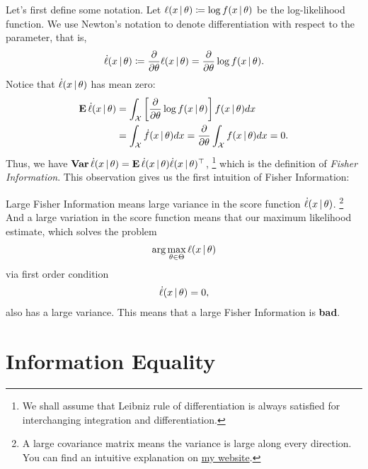 \documentclass[a4paper]{article}
\begin{document}
Let's first define some notation.
Let $\ell(x\,|\,\theta)\coloneqq\log f(x\,|\,\theta)$ be the log-likelihood function.
We use Newton's notation to denote differentiation with respect to the parameter,
that is,
\begin{align*}
	\dot\ell(x\,|\,\theta)
	\coloneqq \frac{\partial}{\partial\theta} \ell(x\,|\,\theta)
	= \frac{\partial}{\partial\theta} \log f(x\,|\,\theta).
\end{align*}
Notice that $\dot\ell(x\,|\,\theta)$ has mean zero:
\begin{align*}
	\operatorname{\text{\textrm{\upshape\textbf{E}}}}\dot\ell(x\,|\,\theta)
	&= \int_{\mathcal{X}} \left[ \frac{\partial}{\partial\theta} \log f(x\,|\,\theta) \right] f(x\,|\,\theta) dx \\
	&= \int_{\mathcal{X}} \dot f(x\,|\,\theta) dx 
	= \frac{\partial}{\partial\theta} \int_{\mathcal{X}} f(x\,|\,\theta) dx = 0.
\end{align*}
Thus, we have $\operatorname{\text{\textrm{\upshape\textbf{Var}}}}\dot\ell(x\,|\,\theta) = \operatorname{\text{\textrm{\upshape\textbf{E}}}}\dot\ell(x\,|\,\theta)\dot\ell(x\,|\,\theta)^{\top}$,
\footnote{
	We shall assume that Leibniz rule of differentiation is always satisfied for interchanging integration and differentiation.
}
which is the definition of \emph{Fisher Information}.
This observation gives us the first intuition of Fisher Information:

\begin{intuition}\label{intuition-1}
	Large Fisher Information means large variance in the score function $\dot\ell(x\,|\,\theta)$.
	\footnote{
		A large covariance matrix means the variance is large along every direction.
		You can find an intuitive explanation on \href{https://jessekelighine.com}{my website}.
	}
	And a large variation in the score function means that our maximum likelihood estimate,
	which solves the problem
	\begin{align*}
		\arg\max_{\theta\in\Theta}\ell(x\,|\,\theta)
	\end{align*}
	via first order condition
	\begin{align*} 
		\dot\ell(x\,|\,\theta)=0,
	\end{align*}
	also has a large variance.
	This means that a large Fisher Information is \textbf{bad}.
\end{intuition}

\section{Information Equality}
\end{document}
